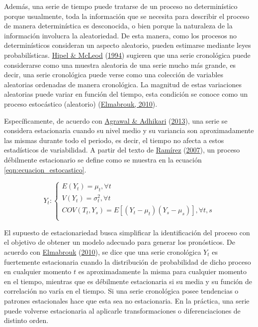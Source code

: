 \documentclass[
]{article}
\begin{document}
Además, una serie de tiempo puede tratarse de un proceso no
determinístico porque usualmente, toda la información que se necesita
para describir el proceso de manera determinística es desconocida, o
bien porque la naturaleza de la información involucra la aleatoriedad.
De esta manera, como los procesos no determinísticos consideran un
aspecto aleatorio, pueden estimarse mediante leyes probabilísticas.
\protect\hyperlink{ref-Hipel}{Hipel \& McLeod}
(\protect\hyperlink{ref-Hipel}{1994}) sugieren que una serie cronológica
puede considerarse como una muestra aleatoria de una serie mucho más
grande, es decir, una serie cronológica puede verse como una colección
de variables aleatorias ordenadas de manera cronológica. La magnitud de
estas variaciones aleatorias puede variar en función del tiempo, esta
condición se conoce como un proceso estocástico (aleatorio)
(\protect\hyperlink{ref-definicion_estocastico}{Elmabrouk, 2010}).

Específicamente, de acuerdo con
\protect\hyperlink{ref-stationary_def}{Agrawal \& Adhikari}
(\protect\hyperlink{ref-stationary_def}{2013}), una serie se considera
estacionaria cuando su nivel medio y su variancia son aproximadamente
las mismas durante todo el periodo, es decir, el tiempo no afecta a
estos estadísticos de variabilidad. A partir del texto de
\protect\hyperlink{ref-introduccion_series}{Ramírez}
(\protect\hyperlink{ref-introduccion_series}{2007}), un proceso
débilmente estacionario se define como se muestra en la ecuación
\eqref{eqn:ecuacion_estocastico}.

\begin{equation}
\label{eqn:ecuacion_estocastico}
Y_t:
\begin{cases}
E(Y_t) = \mu_t, \forall t \\
V(Y_t) = \sigma^2_t, \forall t \\
COV(T_t,Y_s) = E\left[(Y_t-\mu_t)(Y_s-\mu_s)\right], \forall t,s \\
\end{cases}
\end{equation}

El supuesto de estacionariedad busca simplificar la identificación del
proceso con el objetivo de obtener un modelo adecuado para generar los
pronósticos. De acuerdo con
\protect\hyperlink{ref-definicion_estocastico}{Elmabrouk}
(\protect\hyperlink{ref-definicion_estocastico}{2010}), se dice que una
serie cronológica \(Y_t\) es fuertemente estacionaria cuando la
distribución de probabilidad de dicho proceso en cualquier momento \(t\)
es aproximadamente la misma para cualquier momento en el tiempo,
mientras que es débilmente estacionaria si su media y su función de
correlación no varía en el tiempo. Si una serie cronológica posee
tendencias o patrones estacionales hace que esta sea no estacionaria. En
la práctica, una serie puede volverse estacionaria al aplicarle
transformaciones o diferenciaciones de distinto orden.
\end{document}
